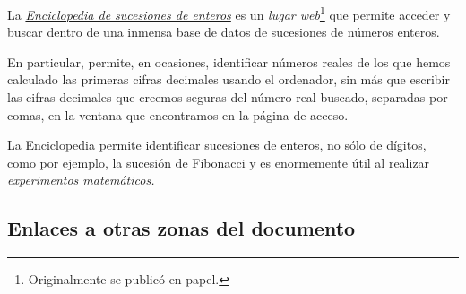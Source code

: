 La \href{https://oeis.org/}{{\itshape  Enciclopedia de sucesiones de enteros}}
es un {\itshape lugar web}\footnote{Originalmente se public\'o en papel.} que
permite acceder y buscar dentro de una inmensa base de datos de sucesiones de
n\'umeros enteros. 

En particular, permite, en ocasiones,  identificar n\'umeros reales de los que
hemos calculado las primeras cifras decimales usando el ordenador, sin m\'as
que escribir las cifras decimales que creemos seguras del
n\'umero real buscado, separadas por comas,   en la ventana que encontramos en
la p\'agina de acceso. 


La Enciclopedia permite identificar sucesiones  de enteros, no
s\'olo de d\'igitos, como por ejemplo, la sucesi\'on de Fibonacci y es
enormemente \'util al realizar {\itshape experimentos matem\'aticos.}
 



\subsection{Enlaces a otras zonas del documento}



